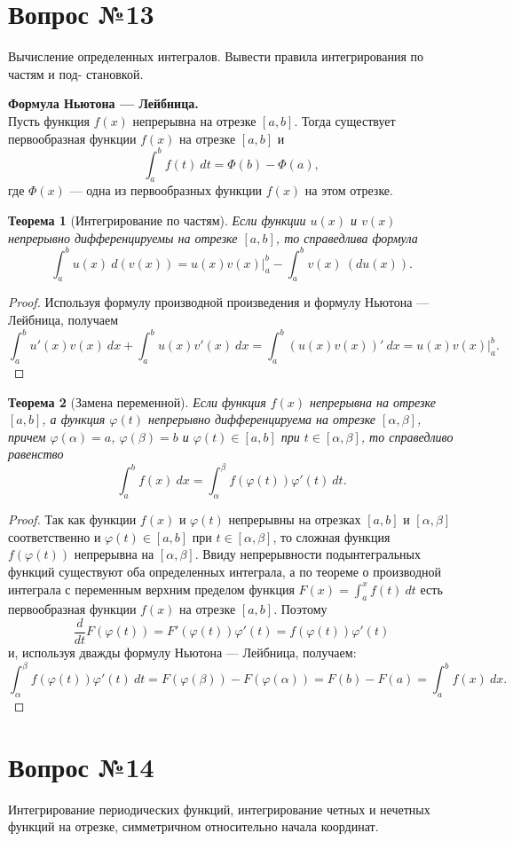 \documentclass[12pt]{article}
\numberwithin{equation}{section}
\newtheorem{theorem}{Теорема}[section]
\begin{document}
\section{Вопрос №13} %
\begin{framed}
Вычисление определенных интегралов. Вывести правила интегрирования по частям и под-
становкой.
\end{framed}

\textbf{Формула Ньютона --- Лейбница.}\\

Пусть функция $f(x)$ непрерывна на отрезке $[a,b]$. Тогда существует первообразная функции $f(x)$ на отрезке $[a,b]$ и
\[ \int_a^b f(t)~dt = \Phi(b) - \Phi(a), \]
где $\Phi(x)$ --- одна из первообразных функции $f(x)$ на этом отрезке.

\begin{theorem}[Интегрирование по частям] \label{th:13:1}
Если функции $u(x)$ и $v(x)$ непрерывно дифференцируемы на отрезке $[a,b]$, то справедлива формула
\[ \int_a^b u(x) ~d(v(x)) = u(x) v(x) \biggr\vert_a^b - \int_a^b v(x)~(du(x)).\]
\end{theorem}
\begin{proof}
Используя формулу производной произведения и формулу Ньютона --- Лейбница, получаем
\[ \int_a^b u'(x) v(x) ~dx + \int_a^b u(x) v'(x) ~dx = \int_a^b(u(x)v(x))' ~dx = u(x)  v(x) \biggr\vert_a^b.\]
\end{proof}

\begin{theorem} [Замена переменной]\label{th:13:2}
Если функция $f(x)$ непрерывна на отрезке $[a,b]$, а функция $\varphi(t)$ непрерывно дифференцируема на отрезке $[\alpha, \beta]$, причем $\varphi(\alpha) = a$, $\varphi(\beta) = b$ и $\varphi(t) \in [a,b]$ при $t \in [\alpha, \beta]$, то справедливо равенство
\[ \int_a^b f(x)~dx = \int_{\alpha}^{\beta} f(\varphi(t)) \varphi'(t)~dt.\]
\end{theorem}
\begin{proof}
Так как функции $f(x)$ и $\varphi(t)$ непрерывны на отрезках $[a,b]$ и $[\alpha, \beta]$ соответственно и $\varphi(t) \in [a,b]$ при $t \in [\alpha, \beta]$, то сложная функция $f(\varphi(t))$ непрерывна на $[\alpha, \beta]$. Ввиду непрерывности подынтегральных функций существуют оба  определенных интеграла, а по теореме о производной интеграла с переменным верхним пределом функция $F(x) = \int_a^x f(t)~dt$ есть первообразная функции $f(x)$ на отрезке $[a,b]$. Поэтому
\[ \frac{d}{dt}F(\varphi(t)) = F'(\varphi(t)) \varphi'(t) = f(\varphi(t))\varphi'(t)\]
и, используя дважды формулу Ньютона --- Лейбница, получаем:
\[ \int_{\alpha}^{\beta} f(\varphi(t))\varphi'(t)~dt = F(\varphi(\beta)) -F(\varphi(\alpha)) = F(b) - F(a) = \int_a^b f(x)~dx. \]
\end{proof}

\section{Вопрос №14} %
\begin{framed}
Интегрирование периодических функций, интегрирование четных и нечетных функций на
отрезке, симметричном относительно начала координат.
\end{framed}
\end{document}
